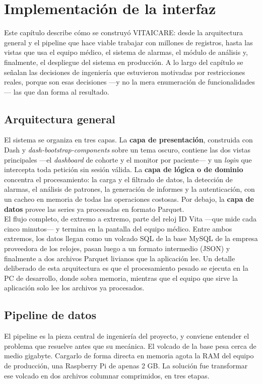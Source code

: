 \section{Implementación de la interfaz}
Este capítulo describe cómo se construyó VITAICARE: desde la arquitectura general y el pipeline que hace viable trabajar con millones de registros, hasta las vistas que usa el equipo médico, el sistema de alarmas, el módulo de análisis y, finalmente, el despliegue del sistema en producción. A lo largo del capítulo se señalan las decisiones de ingeniería que estuvieron motivadas por restricciones reales, porque son esas decisiones —y no la mera enumeración de funcionalidades— las que dan forma al resultado.\\


\subsection{Arquitectura general}
El sistema se organiza en tres capas. La \textbf{capa de presentación}, construida con Dash y \textit{dash-bootstrap-components} sobre un tema oscuro, contiene las dos vistas principales —el \textit{dashboard} de cohorte y el monitor por paciente— y un \textit{login} que intercepta toda petición sin sesión válida. La \textbf{capa de lógica o de dominio} concentra el procesamiento: la carga y el filtrado de datos, la detección de alarmas, el análisis de patrones, la generación de informes y la autenticación, con un cacheo en memoria de todas las operaciones costosas. Por debajo, la \textbf{capa de datos} provee las series ya procesadas en formato Parquet.\\

El flujo completo, de extremo a extremo, parte del reloj ID Vita —que mide cada cinco minutos— y termina en la pantalla del equipo médico. Entre ambos extremos, los datos llegan como un volcado SQL de la base MySQL de la empresa proveedora de los relojes, pasan luego a un formato intermedio (JSON) y finalmente a dos archivos Parquet livianos que la aplicación lee. Un detalle deliberado de esta arquitectura es que el procesamiento pesado se ejecuta en la PC de desarrollo, donde sobra memoria, mientras que el equipo que sirve la aplicación solo lee los archivos ya procesados.\\


\subsection{Pipeline de datos}
El pipeline es la pieza central de ingeniería del proyecto, y conviene entender el problema que resuelve antes que su mecánica. El volcado de la base pesa cerca de medio gigabyte. Cargarlo de forma directa en memoria agota la RAM del equipo de producción, una Raspberry Pi de apenas 2 GB. La solución fue transformar ese volcado en dos archivos columnar comprimidos, en tres etapas.\\

